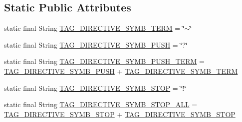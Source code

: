 \subsection*{Static Public Attributes}
\begin{DoxyCompactItemize}
\item 
static final String \hyperlink{classit_1_1emarolab_1_1cagg_1_1core_1_1evaluation_1_1semanticGrammar_1_1SyntaxActionTag_ae3826d8f10b95308988b045fc8bf25d0}{T\-A\-G\-\_\-\-D\-I\-R\-E\-C\-T\-I\-V\-E\-\_\-\-S\-Y\-M\-B\-\_\-\-T\-E\-R\-M} = \char`\"{}$\sim$\char`\"{}
\item 
static final String \hyperlink{classit_1_1emarolab_1_1cagg_1_1core_1_1evaluation_1_1semanticGrammar_1_1SyntaxActionTag_a24693a6371e53ceb9677a3225e864d45}{T\-A\-G\-\_\-\-D\-I\-R\-E\-C\-T\-I\-V\-E\-\_\-\-S\-Y\-M\-B\-\_\-\-P\-U\-S\-H} = \char`\"{}?\char`\"{}
\item 
static final String \hyperlink{classit_1_1emarolab_1_1cagg_1_1core_1_1evaluation_1_1semanticGrammar_1_1SyntaxActionTag_ac974b776d1d5b2f69ab1884f3b943c95}{T\-A\-G\-\_\-\-D\-I\-R\-E\-C\-T\-I\-V\-E\-\_\-\-S\-Y\-M\-B\-\_\-\-P\-U\-S\-H\-\_\-\-T\-E\-R\-M} = \hyperlink{classit_1_1emarolab_1_1cagg_1_1core_1_1evaluation_1_1semanticGrammar_1_1SyntaxActionTag_a24693a6371e53ceb9677a3225e864d45}{T\-A\-G\-\_\-\-D\-I\-R\-E\-C\-T\-I\-V\-E\-\_\-\-S\-Y\-M\-B\-\_\-\-P\-U\-S\-H} + \hyperlink{classit_1_1emarolab_1_1cagg_1_1core_1_1evaluation_1_1semanticGrammar_1_1SyntaxActionTag_ae3826d8f10b95308988b045fc8bf25d0}{T\-A\-G\-\_\-\-D\-I\-R\-E\-C\-T\-I\-V\-E\-\_\-\-S\-Y\-M\-B\-\_\-\-T\-E\-R\-M}
\item 
static final String \hyperlink{classit_1_1emarolab_1_1cagg_1_1core_1_1evaluation_1_1semanticGrammar_1_1SyntaxActionTag_ab783445ee6233fd88a706769a334261b}{T\-A\-G\-\_\-\-D\-I\-R\-E\-C\-T\-I\-V\-E\-\_\-\-S\-Y\-M\-B\-\_\-\-S\-T\-O\-P} = \char`\"{}!\char`\"{}
\item 
static final String \hyperlink{classit_1_1emarolab_1_1cagg_1_1core_1_1evaluation_1_1semanticGrammar_1_1SyntaxActionTag_a3fdab0b2c54852d064051f403050ecc3}{T\-A\-G\-\_\-\-D\-I\-R\-E\-C\-T\-I\-V\-E\-\_\-\-S\-Y\-M\-B\-\_\-\-S\-T\-O\-P\-\_\-\-A\-L\-L} = \hyperlink{classit_1_1emarolab_1_1cagg_1_1core_1_1evaluation_1_1semanticGrammar_1_1SyntaxActionTag_ab783445ee6233fd88a706769a334261b}{T\-A\-G\-\_\-\-D\-I\-R\-E\-C\-T\-I\-V\-E\-\_\-\-S\-Y\-M\-B\-\_\-\-S\-T\-O\-P} + \hyperlink{classit_1_1emarolab_1_1cagg_1_1core_1_1evaluation_1_1semanticGrammar_1_1SyntaxActionTag_ab783445ee6233fd88a706769a334261b}{T\-A\-G\-\_\-\-D\-I\-R\-E\-C\-T\-I\-V\-E\-\_\-\-S\-Y\-M\-B\-\_\-\-S\-T\-O\-P}

\end{DoxyCompactItemize}

